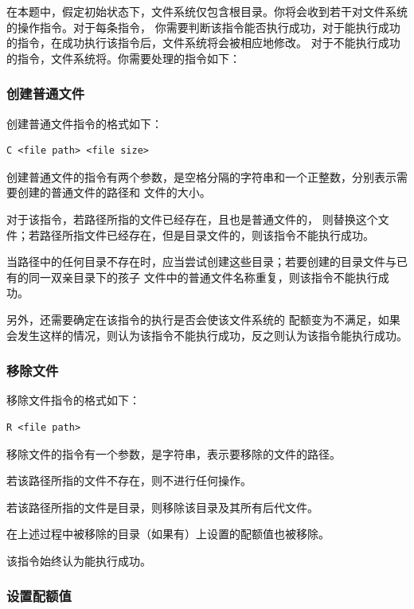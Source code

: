 在本题中，假定初始状态下，文件系统仅包含根目录。你将会收到若干对文件系统的操作指令。对于每条指令，
你需要判断该指令能否执行成功，对于能执行成功的指令，在成功执行该指令后，文件系统将会被相应地修改。
对于不能执行成功的指令，文件系统将{}。你需要处理的指令如下：

\subsubsection*{创建普通文件}

创建普通文件指令的格式如下：

\begin{lstlisting}
C <file path> <file size>
\end{lstlisting}

创建普通文件的指令有两个参数，是空格分隔的字符串和一个正整数，分别表示需要创建的普通文件的路径和
文件的大小。

对于该指令，若路径所指的文件已经存在，且也是普通文件的，
则替换这个文件；若路径所指文件已经存在，但是目录文件的，则该指令不能执行成功。

当路径中的任何目录不存在时，应当尝试创建这些目录；若要创建的目录文件与已有的同一双亲目录下的孩子
文件中的普通文件名称重复，则该指令不能执行成功。

另外，还需要确定在该指令的执行是否会使该文件系统的
配额变为不满足，如果会发生这样的情况，则认为该指令不能执行成功，反之则认为该指令能执行成功。

\subsubsection*{移除文件}

移除文件指令的格式如下：

\begin{lstlisting}
R <file path>
\end{lstlisting}

移除文件的指令有一个参数，是字符串，表示要移除的文件的路径。

若该路径所指的文件不存在，则不进行任何操作。

若该路径所指的文件是目录，则移除该目录及其所有后代文件。

在上述过程中被移除的目录（如果有）上设置的配额值也被移除。

该指令始终认为能执行成功。

\subsubsection*{设置配额值}


